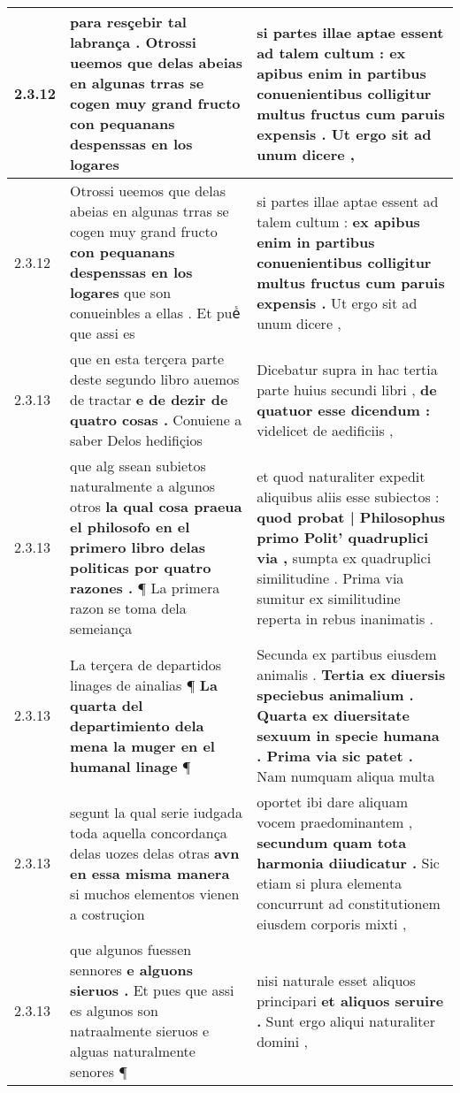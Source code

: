 \begin{tabular}{|p{1cm}|p{6.5cm}|p{6.5cm}|}
2.3.12 & para resçebir tal labrança . \textbf{ Otrossi ueemos que delas abeias en algunas trras se cogen muy grand fructo } con pequanans despenssas en los logares & si partes illae aptae essent ad talem cultum : \textbf{ ex apibus enim in partibus conuenientibus colligitur multus fructus cum paruis expensis . } Ut ergo sit ad unum dicere , \\\hline
2.3.12 & Otrossi ueemos que delas abeias en algunas trras se cogen muy grand fructo \textbf{ con pequanans despenssas en los logares } que son conueinbles a ellas . Et pueᷤ que assi es & si partes illae aptae essent ad talem cultum : \textbf{ ex apibus enim in partibus conuenientibus colligitur multus fructus cum paruis expensis . } Ut ergo sit ad unum dicere , \\\hline
2.3.13 & que en esta terçera parte deste segundo libro auemos de tractar \textbf{ e de dezir de quatro cosas . } Conuiene a saber Delos hedifiçios & Dicebatur supra in hac tertia parte huius secundi libri , \textbf{ de quatuor esse dicendum : } videlicet de aedificiis , \\\hline
2.3.13 & que alg ssean subietos naturalmente a algunos otros \textbf{ la qual cosa praeua el philosofo en el primero libro delas politicas por quatro razones . } ¶ La primera razon se toma dela semeiança & et quod naturaliter expedit aliquibus aliis esse subiectos : \textbf{ quod probat | Philosophus primo Polit’ quadruplici via , } sumpta ex quadruplici similitudine . Prima via sumitur ex similitudine reperta in rebus inanimatis . \\\hline
2.3.13 & La terçera de departidos linages de ainalias ¶ \textbf{ La quarta del departimiento dela mena la muger en el humanal linage } ¶ & Secunda ex partibus eiusdem animalis . \textbf{ Tertia ex diuersis speciebus animalium . Quarta ex diuersitate sexuum in specie humana . Prima via sic patet . } Nam numquam aliqua multa \\\hline
2.3.13 & segunt la qual serie iudgada toda aquella concordança delas uozes delas otras \textbf{ avn en essa misma manera } si muchos elementos vienen a costruçion & oportet ibi dare aliquam vocem praedominantem , \textbf{ secundum quam tota harmonia diiudicatur . } Sic etiam si plura elementa concurrunt ad constitutionem eiusdem corporis mixti , \\\hline
2.3.13 & que algunos fuessen sennores \textbf{ e alguons sieruos . } Et pues que assi es algunos son natraalmente sieruos e alguas naturalmente senores ¶ & nisi naturale esset aliquos principari \textbf{ et aliquos seruire . } Sunt ergo aliqui naturaliter domini , \\\hline

\end{tabular}
